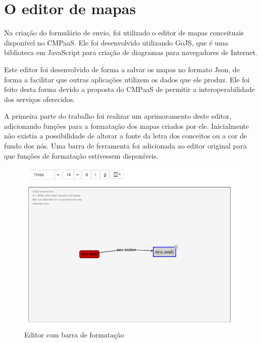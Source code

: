 \documentclass[
	12pt,				%
	openright,			%
	oneside,			%
	a4paper,			%
	english,			%
	french,				%
	spanish,			%
	brazil				%
	]{abntex2}
\begin{document}
\section{O editor de mapas}
Na criação do formulário de envio, foi utilizado o editor de mapas conceituais disponível no CMPaaS. Ele foi desenvolvido utilizando GoJS, que é uma biblioteca em JavaScript para criação de diagramas para navegadores de Internet.

Este editor foi desenvolvido de forma a salvar os mapas no formato Json, de forma a facilitar que outras aplicações utilizem os dados que ele produz. Ele foi feito desta forma devido a proposta do CMPaaS de permitir a interoperabilidade dos serviços oferecidos.

A primeira parte do trabalho foi realizar um aprimoramento deste editor, adicionando funções para a formatação dos mapas criados por ele. Inicialmente não existia a possibilidade de alterar a fonte da letra dos conceitos ou a cor de fundo dos nós. Uma barra de ferramenta foi adicionada ao editor original para que funções de formatação estivessem disponíveis.

\begin{figure}[htb]
	\caption{\label{fig_barraformacao} Editor com barra de formatação}
	\begin{center}
		\includegraphics[scale=0.5]{barraformacao.png}
	\end{center}
\end{figure}

\end{document}
